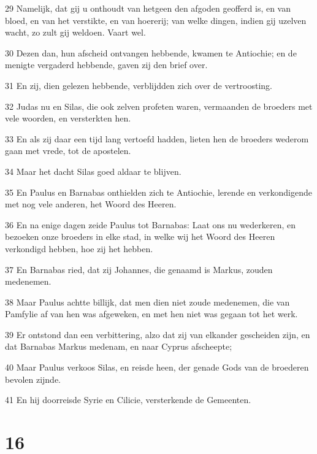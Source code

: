 \par 29 Namelijk, dat gij u onthoudt van hetgeen den afgoden geofferd is, en van bloed, en van het verstikte, en van hoererij; van welke dingen, indien gij uzelven wacht, zo zult gij weldoen. Vaart wel.
\par 30 Dezen dan, hun afscheid ontvangen hebbende, kwamen te Antiochie; en de menigte vergaderd hebbende, gaven zij den brief over.
\par 31 En zij, dien gelezen hebbende, verblijdden zich over de vertroosting.
\par 32 Judas nu en Silas, die ook zelven profeten waren, vermaanden de broeders met vele woorden, en versterkten hen.
\par 33 En als zij daar een tijd lang vertoefd hadden, lieten hen de broeders wederom gaan met vrede, tot de apostelen.
\par 34 Maar het dacht Silas goed aldaar te blijven.
\par 35 En Paulus en Barnabas onthielden zich te Antiochie, lerende en verkondigende met nog vele anderen, het Woord des Heeren.
\par 36 En na enige dagen zeide Paulus tot Barnabas: Laat ons nu wederkeren, en bezoeken onze broeders in elke stad, in welke wij het Woord des Heeren verkondigd hebben, hoe zij het hebben.
\par 37 En Barnabas ried, dat zij Johannes, die genaamd is Markus, zouden medenemen.
\par 38 Maar Paulus achtte billijk, dat men dien niet zoude medenemen, die van Pamfylie af van hen was afgeweken, en met hen niet was gegaan tot het werk.
\par 39 Er ontstond dan een verbittering, alzo dat zij van elkander gescheiden zijn, en dat Barnabas Markus medenam, en naar Cyprus afscheepte;
\par 40 Maar Paulus verkoos Silas, en reisde heen, der genade Gods van de broederen bevolen zijnde.
\par 41 En hij doorreisde Syrie en Cilicie, versterkende de Gemeenten.

\chapter{16}

